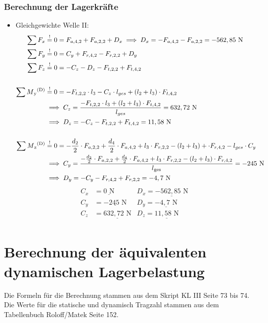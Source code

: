 \subsubsection{Berechnung der Lagerkräfte}
\begin{itemize}
	\item Gleichgewichte Welle II:
	\begin{align*}
	\sum F_x &\overset{!}{=} 0 = F_{a,4,2} +F_{a,2,2} + D_x \implies D_x = -F_{a,4,2} -F_{a,2,2}= -562,85 \text{ N} \\
	\sum F_y &\overset{!}{=} 0 = C_y +F_{r,4,2}- F_{r,2,2}+D_y \\ 
	\sum F_z &\overset{!}{=} 0 = - C_z - D_z - F_{t,2,2} + F_{t,4,2} \\ \\
	\sum M\textsubscript{y}\textsuperscript{(D)} &\overset{!}{=} 0 = - F_{t,2,2} \cdot l_3 - C_z \cdot l_{ges} +(l_2 + l_3) \cdot F_{t,4,2} \\ 
	&\implies C_z = \frac{- F_{t,2,2} \cdot l_3 + (l_2+l_3) \cdot F_{t,4,2} }{l_{ges}} = 632,72 \text { N} \\ 
	& \implies D_z = - C_z - F_{t,2,2} + F_{t,4,2}= 11,58 \text{ N}\\ \\
	\sum M\textsubscript{z}\textsuperscript{(D)} &\overset{!}{=} 0 = - \frac{d_2}{2} \cdot F_{a,2,2} + \frac{d_4}{2} \cdot F_{a,4,2} + l_3 \cdot F_{r,2,2} - (l_2 + l_3)+ \cdot F_{r,4,2}- l_{ges} \cdot C_y  \\ 
	&\implies C_y = \frac{- \frac{d_2}{2} \cdot F_{a,2,2} + \frac{d_4}{2} \cdot F_{a,4,2}  + l_3 \cdot F_{r,2,2} - (l_2 + l_3) \cdot F_{r,4,2}}{l\textsubscript{ges}} = -245 \text{ N}\\ 
	& \implies D_y =  - C_y - F_{r,4,2} + F_{r,2,2} = -4,7\text{ N}\\ 
	\end{align*}
	\begin{align*}
	C_x &= \underline{0\text{ N}} & D_x= \underline{-562,85\text{ N}}\\
	C_y &= \underline{-245\text{ N}} & D_y= \underline{-4,7\text{ N}}\\
	C_z &= \underline{632,72\text{ N}} & D_z= \underline{11,58\text{ N}}\\
	\end{align*}
\end{itemize}
\section{Berechnung der äquivalenten dynamischen Lagerbelastung}
Die Formeln für die Berechnung stammen aus dem Skript KL III Seite 73 bis 74.
Die Werte für die statische und dynamisch Tragzahl stammen aus dem Tabellenbuch Roloff/Matek  Seite 152.

